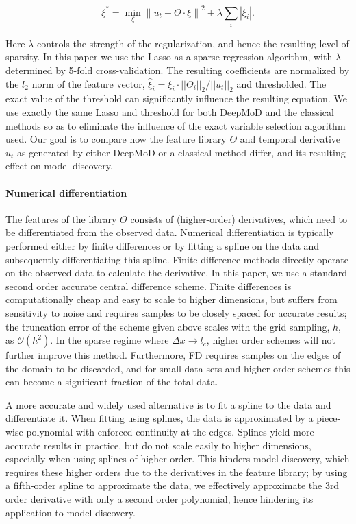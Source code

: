 \documentclass{article} %
\begin{document}
\begin{equation}
    \xi^* = \min_{\xi} \left \lVert u_t - \Theta \cdot \xi\right\rVert^2 + \lambda \sum_i |\xi_i|.
\label{eq:reg}
\end{equation}

Here $\lambda$ controls the strength of the regularization, and hence the resulting level of sparsity. In this paper we use the Lasso as a sparse regression algorithm, with $\lambda$ determined by 5-fold cross-validation. The resulting coefficients are normalized by the $l_2$ norm of the feature vector, $\hat{\xi}_i = \xi_i\cdot ||\Theta_i||_2 / ||u_t||_2$ and thresholded. The exact value of the threshold can significantly influence the resulting equation. We use exactly the same Lasso and threshold for both DeepMoD and the classical methods so as to eliminate the influence of the exact variable selection algorithm used. Our goal is to compare how the feature library $\Theta$ and temporal derivative $u_t$ as generated by either DeepMoD or a classical method differ, and its resulting effect on model discovery.


\paragraph{Numerical differentiation}

The features of the library $\Theta$ consists of (higher-order) derivatives, which need to be differentiated from the observed data. Numerical differentiation is typically performed either by finite differences or by fitting a spline on the data and subsequently differentiating this spline. Finite difference methods directly operate on the observed data to calculate the derivative. In this paper, we use a standard second order accurate central difference scheme. Finite differences is computationally cheap and easy to scale to higher dimensions, but suffers from sensitivity to noise and requires samples to be closely spaced for accurate results; the truncation error of the scheme given above scales with the grid sampling, $h$, as $\mathcal{O}\left( h^2\right)$. In the sparse regime where $\Delta x \to l_c$, higher order schemes will not further improve this method. Furthermore, FD requires samples on the edges of the domain to be discarded, and for small data-sets and higher order schemes this can become a significant fraction of the total data.

A more accurate and widely used alternative is to fit a spline to the data and differentiate it. When fitting using splines, the data is approximated by a piece-wise polynomial with enforced continuity at the edges. Splines yield more accurate results in practice, but do not scale easily to higher dimensions, especially when using splines of higher order. This hinders model discovery, which requires these higher orders due to the derivatives in the feature library; by using a fifth-order spline to approximate the data, we effectively approximate the 3rd order derivative with only a second order polynomial, hence hindering its application to model discovery.
\end{document}
